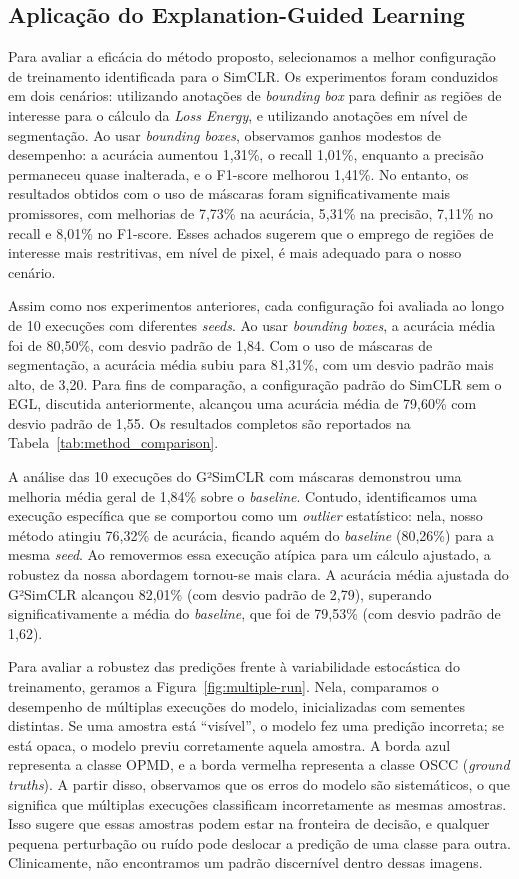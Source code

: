 \subsection{Aplicação do Explanation-Guided Learning}
\label{sec:applying_model_guidance}
Para avaliar a eficácia do método proposto, selecionamos a melhor configuração de treinamento identificada para o SimCLR. Os experimentos foram conduzidos em dois cenários: utilizando anotações de \textit{bounding box} para definir as regiões de interesse para o cálculo da \textit{Loss Energy}, e utilizando anotações em nível de segmentação. Ao usar \textit{bounding boxes}, observamos ganhos modestos de desempenho: a acurácia aumentou 1,31\%, o recall 1,01\%, enquanto a precisão permaneceu quase inalterada, e o F1-score melhorou 1,41\%. No entanto, os resultados obtidos com o uso de máscaras foram significativamente mais promissores, com melhorias de 7,73\% na acurácia, 5,31\% na precisão, 7,11\% no recall e 8,01\% no F1-score. Esses achados sugerem que o emprego de regiões de interesse mais restritivas, em nível de pixel, é mais adequado para o nosso cenário.

Assim como nos experimentos anteriores, cada configuração foi avaliada ao longo de 10 execuções com diferentes \textit{seeds}. Ao usar \textit{bounding boxes}, a acurácia média foi de 80,50\%, com desvio padrão de 1,84. Com o uso de máscaras de segmentação, a acurácia média subiu para 81,31\%, com um desvio padrão mais alto, de 3,20. Para fins de comparação, a configuração padrão do SimCLR sem o EGL, discutida anteriormente, alcançou uma acurácia média de 79,60\% com desvio padrão de 1,55. Os resultados completos são reportados na Tabela~\ref{tab:method_comparison}.

A análise das 10 execuções do G²SimCLR com máscaras demonstrou uma melhoria média geral de 1,84\% sobre o \textit{baseline}. Contudo, identificamos uma execução específica que se comportou como um \textit{outlier} estatístico: nela, nosso método atingiu 76,32\% de acurácia, ficando aquém do \textit{baseline} (80,26\%) para a mesma \textit{seed}. Ao removermos essa execução atípica para um cálculo ajustado, a robustez da nossa abordagem tornou-se mais clara. A acurácia média ajustada do G²SimCLR alcançou 82,01\% (com desvio padrão de 2,79), superando significativamente a média do \textit{baseline}, que foi de 79,53\% (com desvio padrão de 1,62).

Para avaliar a robustez das predições frente à variabilidade estocástica do treinamento, geramos a Figura~\ref{fig:multiple-run}. Nela, comparamos o desempenho de múltiplas execuções do modelo, inicializadas com sementes distintas. Se uma amostra está ``visível'', o modelo fez uma predição incorreta; se está opaca, o modelo previu corretamente aquela amostra. A borda azul representa a classe OPMD, e a borda vermelha representa a classe OSCC (\textit{ground truths}). A partir disso, observamos que os erros do modelo são sistemáticos, o que significa que múltiplas execuções classificam incorretamente as mesmas amostras. Isso sugere que essas amostras podem estar na fronteira de decisão, e qualquer pequena perturbação ou ruído pode deslocar a predição de uma classe para outra. Clinicamente, não encontramos um padrão discernível dentro dessas imagens.

